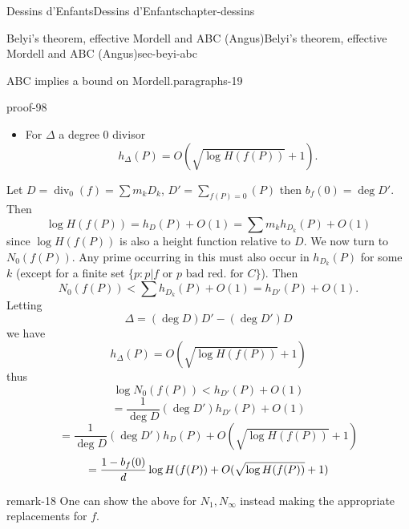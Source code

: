 \documentclass[oneside,10pt,]{book}
\renewcommand{\qedhere}{\relax}
\numberwithin{equation}{section}
\DeclareMathOperator{\divisor}{div}
\newcommand{\lt}{<}
\begin{document}
\begin{chapterptx}{Dessins d'Enfants}{}{Dessins d'Enfants}{}{}{chapter-dessins}
\begin{sectionptx}{Belyi's theorem, effective Mordell and ABC (Angus)}{}{Belyi's theorem, effective Mordell and ABC (Angus)}{}{}{sec-beyi-abc}
\begin{paragraphs}{ABC implies a bound on Mordell.}{paragraphs-19}
\begin{proofptx}{}{proof-98}
\begin{itemize}[label=\textbullet]
\begin{equation*}
D=  \sum m_k D_k
\end{equation*}
is a decomposition into irreducible divisors, then%
\begin{equation*}
h_D(P) = \sum m_k h_{D_k}(P)\text{.}
\end{equation*}
%
\item{}For \(\Delta\) a degree 0 divisor%
\begin{equation*}
h_{\Delta} (P) = O(\sqrt{\log H(f(P))} + 1)\text{.}
\end{equation*}
%
\end{itemize}
%
\par
\hypertarget{p-689}{}%
Let \(D = \divisor_0(f) = \sum m_k D_k\), \(D' = \sum_{f(P) = 0} (P)\) then \(b_f(0) = \deg D'\). Then%
\begin{equation*}
\log H(f(P)) = h_D(P) + O(1) = \sum m_k h_{D_k}(P) + O(1)
\end{equation*}
since \(\log H(f(P))\) is also a height function relative to \(D\). We now turn to \(N_0(f(P))\). Any prime occurring in this must also occur in \(h_{D_k}(P)\) for some \(k\) (except for a finite set \(\{p : p|f \text{ or } p \text{ bad red. for } C\}\)). Then%
\begin{equation*}
N_0(f(P))  \lt \sum h_{D_k}(P) + O(1) = h_{D'}(P) + O(1)\text{.}
\end{equation*}
Letting%
\begin{equation*}
\Delta = (\deg D) D' - (\deg D') D
\end{equation*}
we have%
\begin{equation*}
h_{\Delta} (P) = O(\sqrt{\log H(f(P))} + 1)
\end{equation*}
thus%
\begin{equation*}
\log N_0(f(P)) \lt h_{D'} (P) + O(1)
\end{equation*}
%
\begin{equation*}
= \frac{1}{\deg D} (\deg D') h_{D'} (P) + O(1)
\end{equation*}
%
\begin{equation*}
= \frac{1}{\deg D} (\deg D') h_{D} (P) + O(\sqrt{\log H(f(P))} + 1)
\end{equation*}
%
\begin{equation*}
= \frac{1- b_f(0)}{d} \log  H(f(P)) + O(\sqrt{\log H(f(P))} + 1)\qedhere
\end{equation*}
%
\end{proofptx}
\begin{remark}{}{remark-18}%
\hypertarget{p-690}{}%
One can show the above for \(N_1, N_\infty\) instead making the appropriate replacements for \(f\).%

\end{remark}
\end{paragraphs}
\end{sectionptx}
\end{chapterptx}
\end{document}
